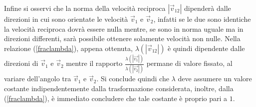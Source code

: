 Infine si osservi che la norma della velocità reciproca $|\vec{v}_{12}|$ dipenderà dalle direzioni in cui sono orientate le velocità $\vec{v}_1$ e $\vec{v}_2$, infatti se le due sono identiche la velocità reciproca dovrà essere nulla mentre, se sono in norma uguale ma in direzioni differenti, sarà possibile ottenere solamente velocità non nulle. Nella relazione (\ref{fraclambda}), appena ottenuta, $\lambda(|\vec{v}_{12}|)$ è quindi dipendente dalle direzioni di $\vec{v}_1$ e $\vec{v}_2$ mentre il rapporto $\frac{\lambda(|\vec{v_1}|)}{\lambda(|\vec{v_2}|)}$ permane di valore fissato, al variare dell'angolo tra $\vec{v}_1$ e $\vec{v}_2$. Si conclude quindi che $\lambda$ deve assumere un valore costante indipendentemente dalla trasformazione considerata, inoltre, dalla (\ref{fraclambda}), è immediato concludere che tale costante è proprio pari a $1$.\\


